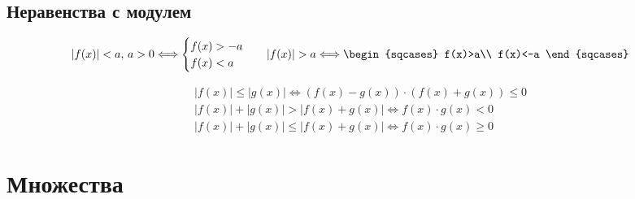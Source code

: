 \documentclass[12pt]{article}
\begin{document}
\subsection{Неравенства с модулем}

\begin{align*}
    &|f(x)|<a, \, a>0 \Longleftrightarrow 
    \begin{cases}
        f(x)>-a\\
        f(x)<a
    \end{cases}& 
    &|f(x)|>a \Longleftrightarrow
    \begin{sqcases}
        f(x)>a\\
        f(x)<-a
    \end{sqcases}
\end{align*}

\begin{align*}
    &|f(x)|\leq|g(x)| \Longleftrightarrow (f(x)-g(x))\cdot(f(x)+g(x))\leq0\\
    &|f(x)|+|g(x)|>|f(x)+g(x)| \Longleftrightarrow f(x)\cdot g(x) < 0\\
    &|f(x)|+|g(x)|\leq|f(x)+g(x)| \Longleftrightarrow f(x)\cdot g(x) \geq 0
\end{align*}

\section{Множества}
\end{document}
